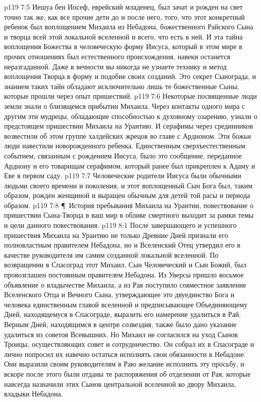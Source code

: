 \vs p119 7:5 Иешуа бен Иосеф, еврейский младенец, был зачат и рожден на свет точно так же, как все прочие дети до и после него,  того, что этот конкретный ребенок был воплощением Михаила из Небадона, божественного Райского Сына и творца всей этой локальной вселенной и всего, что есть в ней. И эта тайна воплощения Божества в человеческую форму Иисуса, который в этом мире в прочих отношениях был естественного происхождения, навеки останется неразгаданной. Даже в вечности вы никогда не узнаете технику и метод воплощения Творца в форму и подобие своих созданий. Это секрет Сынограда, и знанием таких тайн обладают исключительно лишь те божественные Сыны, которые прошли через опыт пришествий.
\vs p119 7:6 Некоторые посвященные люди земли знали о близящемся прибытии Михаила. Через контакты одного мира с другим эти мудрецы, обладающие способностью к духовному озарению, узнали о предстоящем пришествии Михаила на Урантию. И серафимы через срединников возвестили об этом группе халдейских жрецов во главе с Ардноном. Эти божьи люди навестили новорожденного ребенка. Единственным сверхъестественным событием, связанным с рождением Иисуса, было это сообщение, переданное Арднону и его товарищам серафимом, который ранее был прикреплен к Адаму и Еве в первом саду.
\vs p119 7:7 Человеческие родители Иисуса были обычными людьми своего времени и поколения, и этот воплощенный Сын Бога был, таким образом, рожден женщиной и выращен обычным для детей той расы и периода образом.
\vs p119 7:8 \P\ История пребывания Михаила на Урантии, повествование о пришествии Сына\hyp{}Творца в ваш мир в облике смертного выходит за рамки темы и цели данного повествования.
\vs p119 8:1 После завершающего и успешного пришествия Михаила на Урантию не только Древние Дней признали его полновластным правителем Небадона, но и Вселенский Отец утвердил его в качестве руководителя им самим созданной локальной вселенной. По возвращении в Спасоград этот Михаил, Сын Человеческий и Сын Божий, был провозглашен постоянным правителем Небадона. Из Уверсы пришло восьмое объявление о владычестве Михаила, а из Рая поступило совместное заявление Вселенского Отца и Вечного Сына, утверждающее это двуединство Бога и человека единственным главой вселенной и предписывающее Объединяющему Дней, находящемуся в Спасограде, выразить его намерение удалиться в Рай. Верным Дней, находящимся в центре созвездия, также было дано указание удалиться из советов Всевышних. Но Михаил не согласился на уход Сынов Троицы, осуществляющих совет и сотрудничество. Он собрал их в Спасограде и лично попросил их навечно остаться исполнять свои обязанности в Небадоне. Они выразили своим руководителям в Раю желание исполнить эту просьбу, и вскоре после этого были отданы те распоряжения об отделении от Рая, которые навсегда назначили этих Сынов центральной вселенной ко двору Михаила, владыки Небадона.

